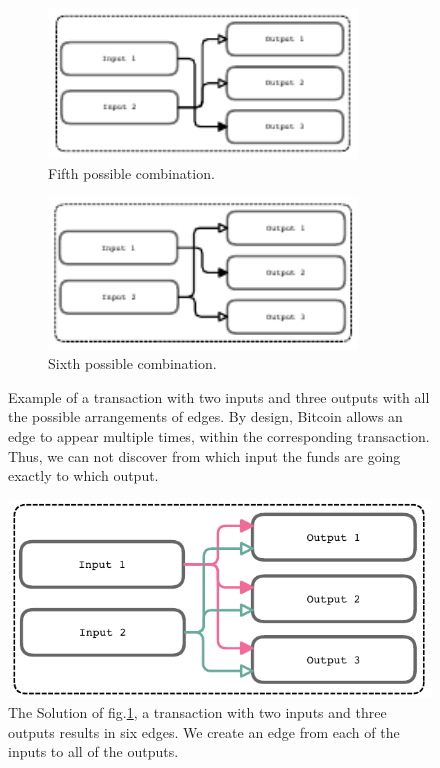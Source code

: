 \documentclass[../../thesis.tex]{subfiles}
\begin{document}
\begin{figure}
     \begin{subfigure}{0.45\textwidth}
        \centering
        \includegraphics[width=0.9\textwidth]{content/unveiling/img/input-problem-5}         \caption{Fifth possible combination.}
    \end{subfigure}\hfill
    \begin{subfigure}{0.45\textwidth}
        \centering
        \includegraphics[width=0.9\textwidth]{content/unveiling/img/input-problem-6}        \caption{Sixth possible combination.}
    \end{subfigure}

\caption{Example of a transaction with two inputs and three outputs with all the possible arrangements of edges. By design, Bitcoin allows an edge to appear multiple times, within the corresponding transaction. Thus, we can not discover from which input the funds are going exactly to which output. }  
\label{fig:inputProblem}
\end{figure}



\begin{figure}
\centering

\includegraphics[width=\textwidth]{content/unveiling/img/input-solution}
\caption{The Solution of fig.\ref{fig:inputProblem}, a transaction with two inputs and three outputs results in six edges. We create an edge from each of the inputs to all of the outputs.}
\label{fig:inputSolution}
\end{figure}
\end{document}

